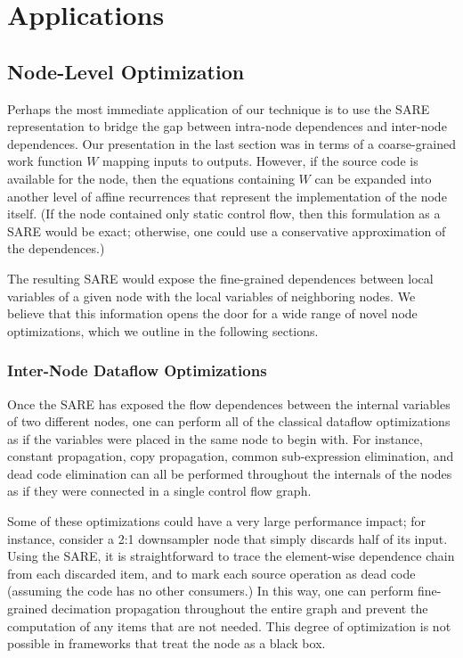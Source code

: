 \section{Applications}

\subsection{Node-Level Optimization}

Perhaps the most immediate application of our technique is to use the
SARE representation to bridge the gap between intra-node dependences
and inter-node dependences.  Our presentation in the last section was
in terms of a coarse-grained work function $W$ mapping inputs to
outputs.  However, if the source code is available for the node, then
the equations containing $W$ can be expanded into another level of
affine recurrences that represent the implementation of the node
itself.  (If the node contained only static control flow, then this
formulation as a SARE would be exact; otherwise, one could use a
conservative approximation of the dependences.)

The resulting SARE would expose the fine-grained dependences between
local variables of a given node with the local variables of
neighboring nodes.  We believe that this information opens the door
for a wide range of novel node optimizations, which we outline in the
following sections.

\subsubsection{Inter-Node Dataflow Optimizations}

Once the SARE has exposed the flow dependences between the internal
variables of two different nodes, one can perform all of the classical
dataflow optimizations as if the variables were placed in the same
node to begin with.  For instance, constant propagation, copy
propagation, common sub-expression elimination, and dead code
elimination can all be performed throughout the internals of the nodes
as if they were connected in a single control flow graph.

Some of these optimizations could have a very large performance
impact; for instance, consider a 2:1 downsampler node that simply
discards half of its input.  Using the SARE, it is straightforward to
trace the element-wise dependence chain from each discarded item, and
to mark each source operation as dead code (assuming the code has no
other consumers.)  In this way, one can perform fine-grained
decimation propagation throughout the entire graph and prevent the
computation of any items that are not needed.  This degree of
optimization is not possible in frameworks that treat the node as a
black box.

